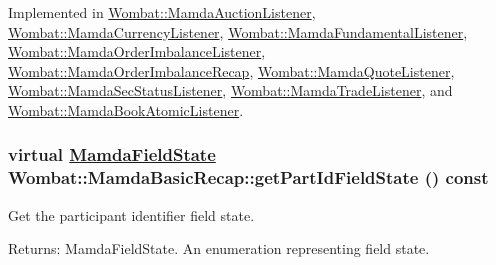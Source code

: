 Implemented in \hyperlink{classWombat_1_1MamdaAuctionListener_e009ff1afdcd5b44383b46177749feac}{Wombat::Mamda\-Auction\-Listener}, \hyperlink{classWombat_1_1MamdaCurrencyListener_2a5ec025f8c088274a68563ebe51f063}{Wombat::Mamda\-Currency\-Listener}, \hyperlink{classWombat_1_1MamdaFundamentalListener_9902a2a7113039defa7114cbf2c88250}{Wombat::Mamda\-Fundamental\-Listener}, \hyperlink{classWombat_1_1MamdaOrderImbalanceListener_2f47719f14e5d1280791c8d832522589}{Wombat::Mamda\-Order\-Imbalance\-Listener}, \hyperlink{classWombat_1_1MamdaOrderImbalanceRecap_a6b1ce60263dc71feb68e3387359f31e}{Wombat::Mamda\-Order\-Imbalance\-Recap}, \hyperlink{classWombat_1_1MamdaQuoteListener_7d1a662d35580eaf5d03260c977999a6}{Wombat::Mamda\-Quote\-Listener}, \hyperlink{classWombat_1_1MamdaSecStatusListener_26936960eb39c5972eff2a4da4036fd3}{Wombat::Mamda\-Sec\-Status\-Listener}, \hyperlink{classWombat_1_1MamdaTradeListener_9fc3574e811a832c3b7244ebf3dd849d}{Wombat::Mamda\-Trade\-Listener}, and \hyperlink{classWombat_1_1MamdaBookAtomicListener_b976bfe1cf039410ca1c586214d6f2f2}{Wombat::Mamda\-Book\-Atomic\-Listener}.\hypertarget{classWombat_1_1MamdaBasicRecap_97e4612d57ce6387e6414b00b201e242}{
\subsubsection[getPartIdFieldState]{\setlength{\rightskip}{0pt plus 5cm}virtual \hyperlink{namespaceWombat_93aac974f2ab713554fd12a1fa3b7d2a}{Mamda\-Field\-State} Wombat::Mamda\-Basic\-Recap::get\-Part\-Id\-Field\-State () const}}
\label{classWombat_1_1MamdaBasicRecap_97e4612d57ce6387e6414b00b201e242}


Get the participant identifier field state. 

\begin{Desc}
\item[Returns:]Mamda\-Field\-State. An enumeration representing field state. \end{Desc}


